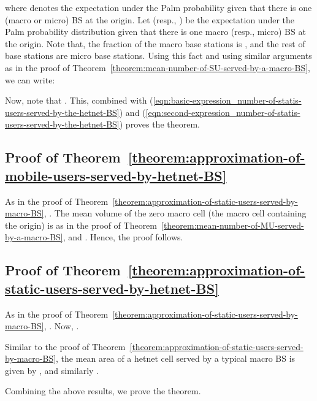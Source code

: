 \documentclass[10pt,journal]{IEEEtran}
\begin{document}
where  denotes the expectation under 
the Palm probability given that there is one (macro or micro) BS at the origin.
Let  (resp., ) be the expectation under the Palm probability distribution given that there is 
one macro (resp., micro)  BS at the origin. Note that, the  
fraction of the macro base stations is , and the rest of base 
stations are micro base stations. Using this fact and using similar arguments as in the proof of 
Theorem~\ref{theorem:mean-number-of-SU-served-by-a-macro-BS}, we can write:

\footnotesize
 
 \normalsize
 
 Now, note that . This, combined with 
 (\ref{eqn:basic-expression_number-of-statis-users-served-by-the-hetnet-BS}) and 
 (\ref{eqn:second-expression_number-of-statis-users-served-by-the-hetnet-BS}) proves the theorem.
 
 


 
 
\subsection{Proof of Theorem~\ref{theorem:approximation-of-mobile-users-served-by-hetnet-BS}} 
\label{subsection:proof-of-approximation-of-mobile-users-served-by-hetnet-BS}
As in the proof of Theorem~\ref{theorem:approximation-of-static-users-served-by-macro-BS}, 
. 
The mean volume of the 
zero macro cell (the macro cell containing the origin) is  as 
in the proof of 
Theorem~\ref{theorem:mean-number-of-MU-served-by-a-macro-BS}, and 
. Hence, the proof follows.
 
 
 
 
 \subsection{Proof of Theorem~\ref{theorem:approximation-of-static-users-served-by-hetnet-BS}} 
 \label{subsection:proof-of-approximation-of-static-users-served-by-hetnet-BS}
 As in the proof of Theorem~\ref{theorem:approximation-of-static-users-served-by-macro-BS}, 
. Now, 
. 

Similar to the proof of Theorem~\ref{theorem:approximation-of-static-users-served-by-macro-BS}, 
the mean area of a hetnet cell served by a typical macro BS is given by  
, 
and similarly .  

Combining the above results, we prove the theorem.

 
 
\end{document}
